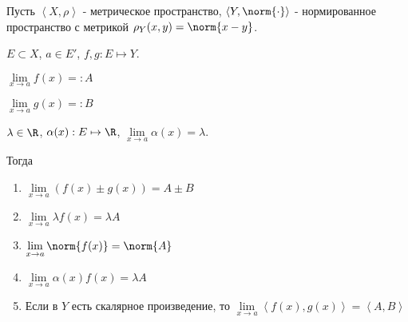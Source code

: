 \begin{properties} \thmslashn

    Пусть $\left<X, \rho\right>$ - метрическое пространство, $\left<Y, \norm{\cdot}\right>$ - нормированное пространство с метрикой $\rho_{Y}(x, y) = \norm{x - y}$.

    $E \subset X$, $a\in E'$, $f, g : E \mapsto Y$.

    $\lim\limits_{x \to a} f(x) =: A$
    
    $\lim\limits_{x \to a} g(x) =: B$

    $\lambda\in \R$, $\alpha(x) : E \mapsto \R$, $\lim\limits_{x \to a} \alpha(x) = \lambda$.

    Тогда
    \begin{enumerate}
        \item $\lim\limits_{x \to a} (f(x) \pm g(x)) = A \pm B$
        \item $\lim\limits_{x \to a} \lambda f(x) = \lambda A$
        \item $\lim\limits_{x \to a} \norm{f(x)} = \norm{A}$ 
        \item $\lim\limits_{x \to a} \alpha(x)f(x) = \lambda A$

        \item Если в $Y$ есть скалярное произведение, то $\lim\limits_{x \to a} \left<f(x), g(x)\right> = \left<A, B\right>$
    \end{enumerate}
\end{properties}
